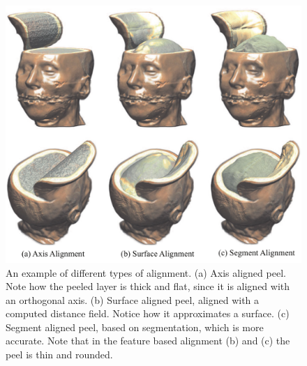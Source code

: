 \begin{figure}
\centering
\includegraphics[width=\textwidth]{Figures/peel.pdf}
\decoRule
\caption[ Feature Aligned Volume Manipulation]{ An example of different types of alignment. (a) Axis aligned peel. Note how the peeled layer is thick and flat, since it is aligned with
an orthogonal axis. (b) Surface aligned peel, aligned with a computed
distance field. Notice how it approximates a surface. (c) Segment
aligned peel, based on segmentation, which is more accurate. Note
that in the feature based alignment (b) and (c) the peel is thin and
rounded.}
\label{fig:peel}
\end{figure}

